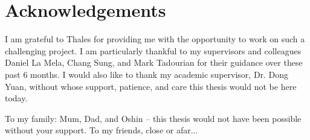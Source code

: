 \chapter*{Acknowledgements}
\thispagestyle{empty}

I am grateful to Thales for providing me with the opportunity to work on such a challenging project. I am particularly thankful to my supervisors and colleagues Daniel La Mela, Chang Sung, and Mark Tadourian for their guidance over these past 6 months. I would also like to thank my academic supervisor, Dr. Dong Yuan, without whose support, patience, and care this thesis would not be here today. 

To my family: Mum, Dad, and Oshin -- this thesis would not have been possible without your support. To my friends, close or afar...




